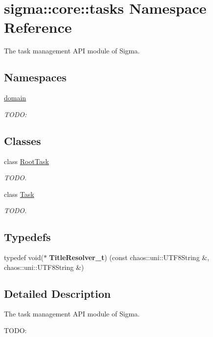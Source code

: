 \hypertarget{namespacesigma_1_1core_1_1tasks}{}\section{sigma\+:\+:core\+:\+:tasks Namespace Reference}
\label{namespacesigma_1_1core_1_1tasks}


The task management A\+P\+I module of Sigma.  


\subsection*{Namespaces}
\begin{DoxyCompactItemize}
\item 
 \hyperlink{namespacesigma_1_1core_1_1tasks_1_1domain}{domain}
\begin{DoxyCompactList}\small\item\em T\+O\+D\+O\+: \end{DoxyCompactList}\end{DoxyCompactItemize}
\subsection*{Classes}
\begin{DoxyCompactItemize}
\item 
class \hyperlink{classsigma_1_1core_1_1tasks_1_1_root_task}{Root\+Task}
\begin{DoxyCompactList}\small\item\em T\+O\+D\+O. \end{DoxyCompactList}\item 
class \hyperlink{classsigma_1_1core_1_1tasks_1_1_task}{Task}
\begin{DoxyCompactList}\small\item\em T\+O\+D\+O. \end{DoxyCompactList}\end{DoxyCompactItemize}
\subsection*{Typedefs}
\begin{DoxyCompactItemize}
\item 
\hypertarget{namespacesigma_1_1core_1_1tasks_a11dad95af17a8509bba2e9bf92534522}{}typedef void($\ast$ {\bfseries Title\+Resolver\+\_\+t}) (const chaos\+::uni\+::\+U\+T\+F8\+String \&, chaos\+::uni\+::\+U\+T\+F8\+String \&)\label{namespacesigma_1_1core_1_1tasks_a11dad95af17a8509bba2e9bf92534522}

\end{DoxyCompactItemize}


\subsection{Detailed Description}
The task management A\+P\+I module of Sigma. 

T\+O\+D\+O\+: 